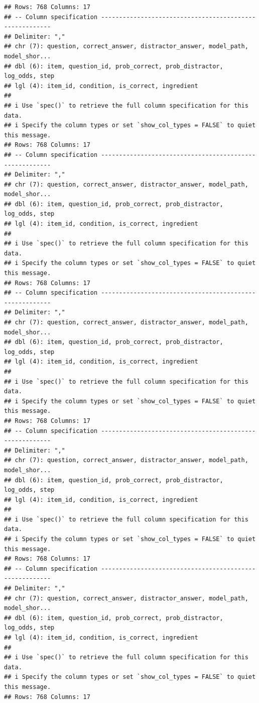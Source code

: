 \documentclass[
]{article}
\begin{document}
\begin{verbatim}
## Rows: 768 Columns: 17
## -- Column specification --------------------------------------------------------
## Delimiter: ","
## chr (7): question, correct_answer, distractor_answer, model_path, model_shor...
## dbl (6): item, question_id, prob_correct, prob_distractor, log_odds, step
## lgl (4): item_id, condition, is_correct, ingredient
## 
## i Use `spec()` to retrieve the full column specification for this data.
## i Specify the column types or set `show_col_types = FALSE` to quiet this message.
## Rows: 768 Columns: 17
## -- Column specification --------------------------------------------------------
## Delimiter: ","
## chr (7): question, correct_answer, distractor_answer, model_path, model_shor...
## dbl (6): item, question_id, prob_correct, prob_distractor, log_odds, step
## lgl (4): item_id, condition, is_correct, ingredient
## 
## i Use `spec()` to retrieve the full column specification for this data.
## i Specify the column types or set `show_col_types = FALSE` to quiet this message.
## Rows: 768 Columns: 17
## -- Column specification --------------------------------------------------------
## Delimiter: ","
## chr (7): question, correct_answer, distractor_answer, model_path, model_shor...
## dbl (6): item, question_id, prob_correct, prob_distractor, log_odds, step
## lgl (4): item_id, condition, is_correct, ingredient
## 
## i Use `spec()` to retrieve the full column specification for this data.
## i Specify the column types or set `show_col_types = FALSE` to quiet this message.
## Rows: 768 Columns: 17
## -- Column specification --------------------------------------------------------
## Delimiter: ","
## chr (7): question, correct_answer, distractor_answer, model_path, model_shor...
## dbl (6): item, question_id, prob_correct, prob_distractor, log_odds, step
## lgl (4): item_id, condition, is_correct, ingredient
## 
## i Use `spec()` to retrieve the full column specification for this data.
## i Specify the column types or set `show_col_types = FALSE` to quiet this message.
## Rows: 768 Columns: 17
## -- Column specification --------------------------------------------------------
## Delimiter: ","
## chr (7): question, correct_answer, distractor_answer, model_path, model_shor...
## dbl (6): item, question_id, prob_correct, prob_distractor, log_odds, step
## lgl (4): item_id, condition, is_correct, ingredient
## 
## i Use `spec()` to retrieve the full column specification for this data.
## i Specify the column types or set `show_col_types = FALSE` to quiet this message.
## Rows: 768 Columns: 17

\end{verbatim}
\end{document}
